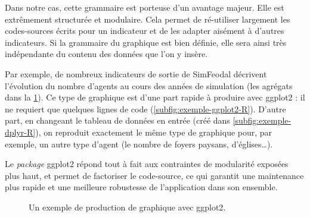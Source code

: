 Dans notre cas, cette grammaire est porteuse d'un avantage majeur.
Elle est extrêmement structurée et modulaire.
Cela permet de ré-utiliser largement les codes-sources écrits pour un indicateur et de les adapter aisément à d'autres indicateurs.
Si la grammaire du graphique est bien définie, elle sera ainsi très indépendante du contenu des données que l'on y insère.


Par exemple, de nombreux indicateurs de sortie de SimFeodal décrivent l'évolution du nombre d'agents au cours des années de simulation (les agrégats dans la \cref{fig:exemple-ggplot2-simedb}).
Ce type de graphique est d'une part rapide à produire avec \textsf{ggplot2} : il ne requiert que quelques lignes de code (\cref{subfig:exemple-ggplot2-R}).
D'autre part, en changeant le tableau de données en entrée (créé dans \cref{subfig:exemple-dplyr-R}), on reproduit exactement le même type de graphique pour, par exemple, un autre type d'agent (le nombre de foyers paysans, d'églises\ldots).

Le \textit{package} \textsf{ggplot2} répond tout à fait aux contraintes de modularité exposées plus haut, et permet de factoriser le code-source, ce qui garantit une maintenance plus rapide et une meilleure robustesse de l'application dans son ensemble.


\begin{figure}[H]
	\centering
	\hspace{5pt}
	\hspace{5pt}
	\caption{Un exemple de production de graphique avec \textsf{ggplot2}.}
	\label{fig:exemple-ggplot2-simedb}
\end{figure}

